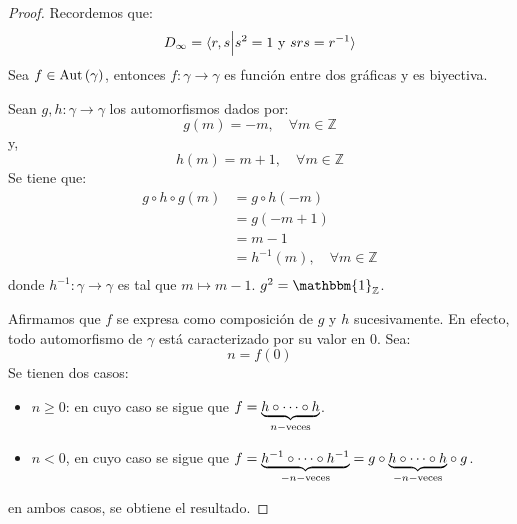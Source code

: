 \documentclass[12pt]{report}
\newcounter{it}
\theoremstyle{largebreak}
\newcommand\cf[3]{\ensuremath{#1:#2\rightarrow#3}}
\newcommand{\bbm}[1]{\ensuremath{\mathbbm{#1}}}
\newcommand{\Aut}[1]{\ensuremath{\textup{Aut}\left(#1\right)}}
\newcommand{\gen}[1]{\ensuremath{\langle#1\rangle}}
\begin{document}
    \begin{proof}
        Recordemos que:
        \begin{equation*}
            D_\infty=\gen{r,s\Big|s^2=1\textup{ y }srs=r^{-1}}
        \end{equation*}
        Sea $f\in\Aut{\gamma}$, entonces $\cf{f}{\gamma}{\gamma}$ es función entre dos gráficas y es biyectiva.

        Sean $\cf{g,h}{\gamma}{\gamma}$ los automorfismos dados por:
        \begin{equation*}
            g(m)=-m,\quad\forall m\in\mathbb{Z}
        \end{equation*}
        y,
        \begin{equation*}
            h(m)=m+1,\quad\forall m\in\mathbb{Z}
        \end{equation*}
        Se tiene que:
        \begin{equation*}
            \begin{split}
                g\circ h\circ g(m)&=g\circ h(-m)\\
                &=g(-m+1)\\
                &=m-1\\
                &=h^{-1}(m),\quad\forall m\in\mathbb{Z} \\
            \end{split}
        \end{equation*}
        donde $\cf{h^{-1}}{\gamma}{\gamma}$ es tal que $m\mapsto m-1$. $g^2=\bbm{1}_\mathbb{Z}$.

        Afirmamos que $f$ se expresa como composición de $g$ y $h$ sucesivamente. En efecto, todo automorfismo de $\gamma$ está caracterizado por su valor en 0. Sea:
        \begin{equation*}
            n=f(0)
        \end{equation*}
        Se tienen dos casos:
        \begin{itemize}
            \item $n\geq0$: en cuyo caso se sigue que $f=\underset{n-\textup{veces}}{\underbrace{h\circ\cdots\circ h}}$.
            \item $n<0$, en cuyo caso se sigue que $f=\underset{-n-\textup{veces}}{\underbrace{h^{-1}\circ\cdots\circ h^{-1}}}=g\circ\underset{-n-\textup{veces}}{\underbrace{h\circ\cdots\circ h}}\circ g$.
        \end{itemize}
        en ambos casos, se obtiene el resultado.
    \end{proof}
\end{document}
